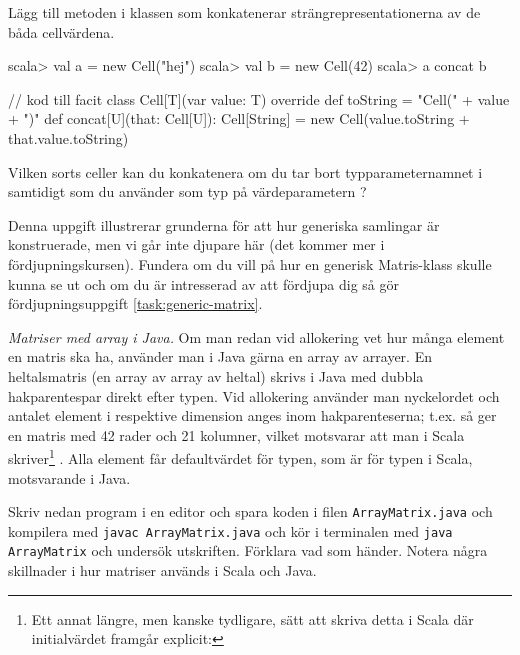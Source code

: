 \Subtask Lägg till metoden  i klassen  som konkatenerar strängrepresentationerna av de båda cellvärdena.

\begin{REPL}
scala> val a = new Cell("hej")
scala> val b = new Cell(42)
scala> a concat b
\end{REPL}

\begin{Code}
// kod till facit
class Cell[T](var value: T){
  override def toString = "Cell(" + value + ")"
  def concat[U](that: Cell[U]): Cell[String] = 
    new Cell(value.toString + that.value.toString)
}
\end{Code}

\Subtask\Pen Vilken sorts celler kan du konkatenera om du tar bort typparameternamnet  i  samtidigt som du använder  som typ på värdeparametern ? 

\Subtask\Pen Denna uppgift illustrerar grunderna för att hur generiska samlingar är konstruerade, men vi går inte djupare här (det kommer mer i fördjupningskursen). Fundera om du vill på hur en generisk Matris-klass skulle kunna se ut och om du är intresserad av att fördjupa dig så gör fördjupningsuppgift \ref{task:generic-matrix}. 





\Task \label{task:arraymatrix-java} \emph{Matriser med array i Java.} Om man redan vid allokering vet hur många element en matris ska ha, använder man i Java gärna en array av arrayer. En heltalsmatris (en array av array av heltal) skrivs i Java med dubbla hakparentespar  direkt efter typen. Vid allokering använder man nyckelordet  och antalet element i respektive dimension anges inom hakparenteserna; t.ex. så ger  en matris med 42 rader och 21 kolumner, vilket motsvarar att man i Scala skriver\footnote{Ett annat längre, men kanske tydligare, sätt att skriva detta i Scala där initialvärdet framgår explicit: }  . Alla element får defaultvärdet för typen, som är  för typen  i Scala, motsvarande  i Java.

\Subtask Skriv nedan program i en editor och spara koden i filen \texttt{ArrayMatrix.java} och kompilera med \texttt{javac ArrayMatrix.java} och kör i terminalen med \texttt{java ArrayMatrix} och undersök utskriften. Förklara vad som händer. Notera några skillnader i hur matriser används i Scala och Java.



